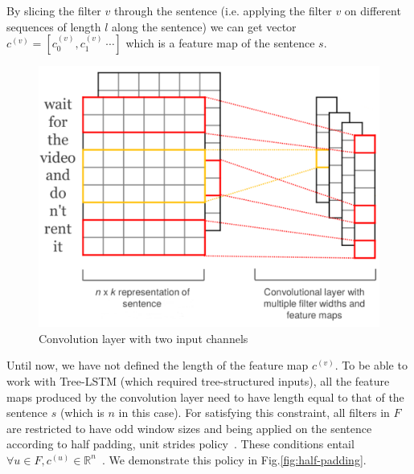 By slicing the filter \(v\) through the sentence (i.e. applying the filter \(v\) on different sequences of length \(l\) along the sentence) we can get vector \(c^{(v)} = [c^{(v)}_0, c^{(v)}_1~\cdots]\) which is a feature map of the sentence \(s\).

\begin{figure}[H]
    \centering
    \includegraphics[scale=0.3]{figure/cnn-module}
    \caption[Convolution layer with two input channels]{Convolution layer with two input channels}
    \label{fig:cnn-module}
\end{figure}

Until now, we have not defined the length of the feature map \(c^{(v)}\). 
To be able to work with Tree-LSTM (which required tree-structured inputs), all the feature maps produced by the convolution layer need to have length equal to that of the sentence \(s\) (which is \(n\) in this case).
For satisfying this constraint, all filters in \(F\) are restricted to have odd window sizes and being applied on the sentence according to half padding, unit strides policy~\cite{conv-arith}.
These conditions entail \({\forall u \in F,  c^{(u)} \in \mathbb{R}^n}\)~\cite{conv-arith}.
We demonstrate this policy in Fig.\ref{fig:half-padding}.

